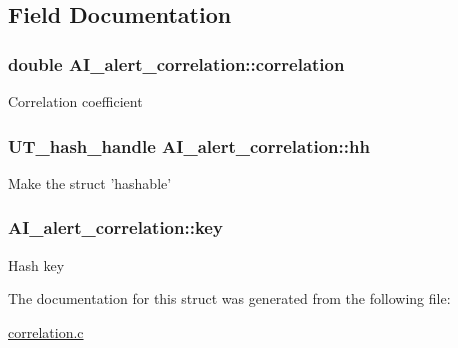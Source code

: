 \subsection{Field Documentation}
\hypertarget{structAI__alert__correlation_aad417b2126ae26d7576f006a3dbcdc81}{
\subsubsection[{correlation}]{\setlength{\rightskip}{0pt plus 5cm}double {\bf AI\_\-alert\_\-correlation::correlation}}}
\label{structAI__alert__correlation_aad417b2126ae26d7576f006a3dbcdc81}
Correlation coefficient \hypertarget{structAI__alert__correlation_ad3020a87936a2193a92f09331401ad42}{
\subsubsection[{hh}]{\setlength{\rightskip}{0pt plus 5cm}UT\_\-hash\_\-handle {\bf AI\_\-alert\_\-correlation::hh}}}
\label{structAI__alert__correlation_ad3020a87936a2193a92f09331401ad42}
Make the struct 'hashable' \hypertarget{structAI__alert__correlation_a4e27da4922a1d44497634c8e5968d870}{
\subsubsection[{key}]{ {\bf AI\_\-alert\_\-correlation::key}}}
\label{structAI__alert__correlation_a4e27da4922a1d44497634c8e5968d870}
Hash key 

The documentation for this struct was generated from the following file:\begin{DoxyCompactItemize}
\item 
\hyperlink{correlation_8c}{correlation.c}\end{DoxyCompactItemize}

